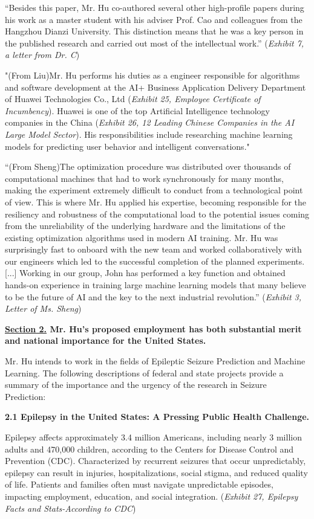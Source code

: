\documentclass{article}
\begin{document}
“Besides this paper, Mr. Hu co-authored several other high-profile papers during his work as a master student with his adviser Prof. Cao and colleagues from the Hangzhou Dianzi University. This distinction means that he was a key person in the published research and carried out most of the intellectual work.” ({\it Exhibit 7, a letter from Dr. C}) 

"(From Liu)Mr. Hu performs his duties as a engineer responsible for algorithms and software development at the AI+ Business Application Delivery Department of Huawei Technologies Co., Ltd ({\it Exhibit 25, Employee Certificate of Incumbency}). Huawei is one of the top Artificial Intelligence technology companies in the China ({\it Exhibit 26, 12 Leading Chinese Companies in the AI Large Model Sector}). His responsibilities include researching machine learning models for predicting user behavior and intelligent conversations."

“(From Sheng)The optimization procedure was distributed over thousands of computational machines that had to work synchronously for many months, making the experiment extremely difficult to conduct from a technological point of view. This is where Mr. Hu applied his expertise, becoming responsible for the resiliency and robustness of the computational load to the potential issues coming from the unreliability of the underlying hardware and the limitations of the existing optimization algorithms used in modern AI training. Mr. Hu was surprisingly fast to onboard with the new team and worked collaboratively with our engineers which led to the successful completion of the planned experiments. [...] Working in our group, John has performed a key function and obtained hands-on experience in training large machine learning models that many believe to be the future of AI and the key to the next industrial revolution.” ({\it Exhibit 3, Letter of Ms. Sheng}) 


\clearpage


{\bf \underline{Section 2.} Mr. Hu’s proposed employment has both substantial merit and national importance for the United States.}

Mr. Hu intends to work in the fields of Epileptic Seizure Prediction and Machine Learning. The following descriptions of federal and state projects provide a summary of the importance and the urgency of the research in  Seizure Prediction:

{\bf 2.1 Epilepsy in the United States: A Pressing Public Health Challenge. }

Epilepsy affects approximately 3.4 million Americans, including nearly 3 million adults and 470,000 children, according to the Centers for Disease Control and Prevention (CDC). Characterized by recurrent seizures that occur unpredictably, epilepsy can result in injuries, hospitalizations, social stigma, and reduced quality of life. Patients and families often must navigate unpredictable episodes, impacting employment, education, and social integration. ({\it Exhibit 27, Epilepsy Facts and Stats-According to CDC}) 
\end{document}
